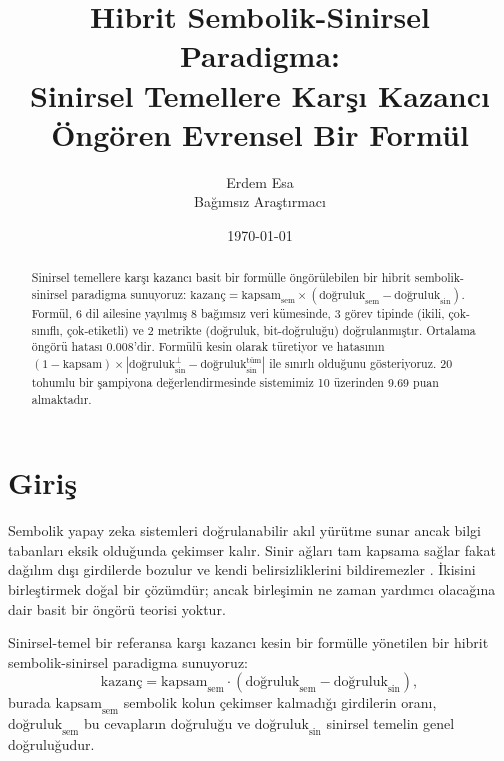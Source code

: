 \documentclass[11pt,a4paper]{article}
\title{Hibrit Sembolik-Sinirsel Paradigma:\\ Sinirsel Temellere Karşı Kazancı Öngören Evrensel Bir Formül}
\author{Erdem Esa\\ \small Bağımsız Araştırmacı}
\date{\today}
\begin{document}
\maketitle

\begin{abstract}
Sinirsel temellere karşı kazancı basit bir formülle öngörülebilen bir
hibrit sembolik-sinirsel paradigma sunuyoruz:
$\text{kazanç} = \text{kapsam}_{\text{sem}} \times
(\text{doğruluk}_{\text{sem}} - \text{doğruluk}_{\text{sin}})$.
Formül, 6 dil ailesine yayılmış 8 bağımsız veri kümesinde, 3 görev
tipinde (ikili, çok-sınıflı, çok-etiketli) ve 2 metrikte (doğruluk,
bit-doğruluğu) doğrulanmıştır. Ortalama öngörü hatası 0.008'dir.
Formülü kesin olarak türetiyor ve hatasının
$(1-\text{kapsam}) \times |\text{doğruluk}_{\text{sin}}^{\perp} -
\text{doğruluk}_{\text{sin}}^{\text{tüm}}|$ ile sınırlı olduğunu
gösteriyoruz. 20 tohumlu bir şampiyona değerlendirmesinde sistemimiz
10 üzerinden 9.69 puan almaktadır.
\end{abstract}

\section{Giriş}
\label{sec:giris}
Sembolik yapay zeka sistemleri doğrulanabilir akıl yürütme sunar
\cite{garcez2023neurosymbolic,manhaeve2018deepproblog} ancak bilgi
tabanları eksik olduğunda çekimser kalır. Sinir ağları tam kapsama
sağlar \cite{vaswani2017attention} fakat dağılım dışı girdilerde
bozulur ve kendi belirsizliklerini bildiremezler
\cite{marcus2020next,bengio2021hybrid}. İkisini birleştirmek doğal bir
çözümdür; ancak birleşimin ne zaman yardımcı olacağına dair basit bir
öngörü teorisi yoktur.

Sinirsel-temel bir referansa karşı kazancı kesin bir formülle yönetilen
bir hibrit sembolik-sinirsel paradigma sunuyoruz:
\begin{equation}
\label{eq:main}
\text{kazanç} = \text{kapsam}_{\text{sem}} \cdot
(\text{doğruluk}_{\text{sem}} - \text{doğruluk}_{\text{sin}}),
\end{equation}
burada $\text{kapsam}_{\text{sem}}$ sembolik kolun çekimser kalmadığı
girdilerin oranı, $\text{doğruluk}_{\text{sem}}$ bu cevapların
doğruluğu ve $\text{doğruluk}_{\text{sin}}$ sinirsel temelin genel
doğruluğudur.
\end{document}
